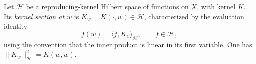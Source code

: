 
Let $\mathcal H$ be a reproducing-kernel Hilbert space of functions on $X$, with kernel $K$. Its \emph{kernel section at $w$} is $K_w=K(\cdot,w)\in\mathcal H$, characterized by the evaluation identity
\[
f(w)=\langle f,K_w\rangle_{\mathcal H},\qquad f\in\mathcal H,
\]
using the convention that the inner product is linear in its first variable. One has $\|K_w\|_{\mathcal H}^2=K(w,w)$.

